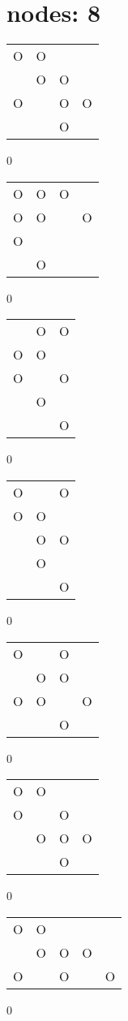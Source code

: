 \section{nodes: 8}
\begin{tabular}{|m{0.2cm}m{0.2cm}m{0.2cm}m{0.2cm}|}\hline
O&O& & \\
 &O&O& \\
O& &O&O\\
 & &O& \\
\hline\end{tabular}0
\begin{tabular}{|m{0.2cm}m{0.2cm}m{0.2cm}m{0.2cm}|}\hline
O&O&O& \\
O&O& &O\\
O& & & \\
 &O& & \\
\hline\end{tabular}0
\begin{tabular}{|m{0.2cm}m{0.2cm}m{0.2cm}|}\hline
 &O&O\\
O&O& \\
O& &O\\
 &O& \\
 & &O\\
\hline\end{tabular}0
\begin{tabular}{|m{0.2cm}m{0.2cm}m{0.2cm}|}\hline
O& &O\\
O&O& \\
 &O&O\\
 &O& \\
 & &O\\
\hline\end{tabular}0
\begin{tabular}{|m{0.2cm}m{0.2cm}m{0.2cm}m{0.2cm}|}\hline
O& &O& \\
 &O&O& \\
O&O& &O\\
 & &O& \\
\hline\end{tabular}0
\begin{tabular}{|m{0.2cm}m{0.2cm}m{0.2cm}m{0.2cm}|}\hline
O&O& & \\
O& &O& \\
 &O&O&O\\
 & &O& \\
\hline\end{tabular}0
\begin{tabular}{|m{0.2cm}m{0.2cm}m{0.2cm}m{0.2cm}m{0.2cm}|}\hline
O&O& & & \\
 &O&O&O& \\
O& &O& &O\\
\hline\end{tabular}0
